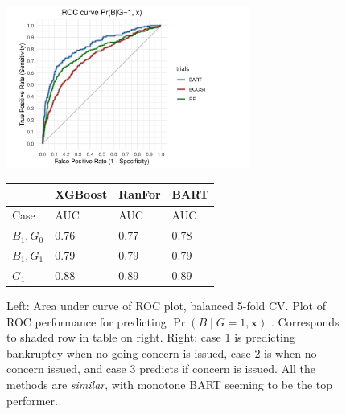 \documentclass[aoas,preprint, 11pt, dvipsnames, table, x11name]{imsart}
\renewcommand{\bm}[1]{\mathbf{#1}}
\theoremstyle{remark}
\begin{document}
	\begin{figure}[!httb]
		
		\begin{minipage}[t]{.5\textwidth}
			
			
			\includegraphics[width=8cm]{roc_pbg1_cv_png}
			
			
			
		\end{minipage}\hfill
		\begin{minipage}[t][-2.2cm][b]{.5\textwidth}	
			\centering
			\begin{tabular}{P{1.1cm}P{1.2cm}P{1.25cm}P{1.25cm}}
				&\color{BrickRed}\textbf{XGBoost}&\color{darkgreen}\textbf{RanFor}&\color{navy}\textbf{BART}\\ \midrule
				
				
				Case   & AUC  & AUC & AUC  \\ \midrule
				$B_1, G_0$ &0.76&0.77&0.78\\ %
				$B_1, G_1$ &0.79 &0.79&0.79 \\%
				$G_1$ &0.88&0.89&0.89 \\ \bottomrule%
			\end{tabular}
			
			
		\end{minipage}
		\caption{Left: Area under curve of ROC plot, balanced 5-fold CV.  Plot of ROC performance for predicting $\Pr(B\mid G=1, \bm{x})$ .  Corresponds to shaded row in table on right.  Right:  case 1 is predicting bankruptcy when no going concern is issued, case 2 is when no concern issued, and case 3 predicts if concern is issued.  All the methods are \emph{similar}, with monotone BART seeming to be the top performer.}
		\label{roc_plot}
	\end{figure}
	
\end{document}
